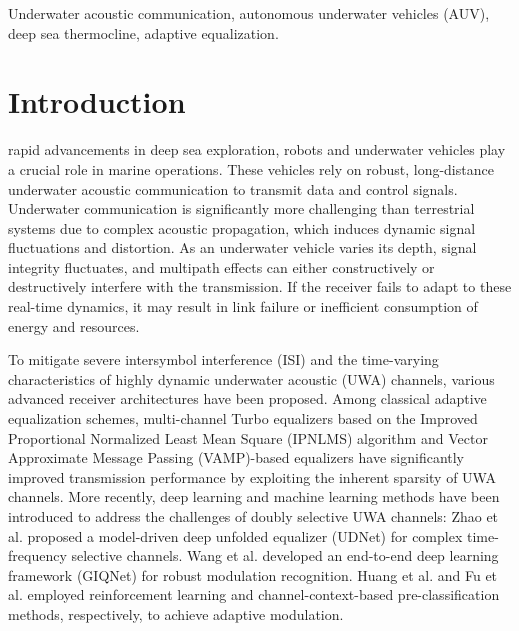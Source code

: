 \documentclass[lettersize,journal]{IEEEtran}
\begin{document}
\begin{IEEEkeywords}
Underwater acoustic communication, autonomous underwater vehicles (AUV), deep sea thermocline, adaptive equalization.
\end{IEEEkeywords}

\section{Introduction}

 rapid advancements in deep sea exploration, robots and underwater vehicles play a crucial role in marine operations. These vehicles rely on robust, long-distance underwater acoustic communication to transmit data and control signals\cite{ref1, ref2}. Underwater communication is significantly more challenging than terrestrial systems due to complex acoustic propagation, which induces dynamic signal fluctuations and distortion. As an underwater vehicle varies its depth, signal integrity fluctuates, and multipath effects can either constructively or destructively interfere with the transmission. If the receiver fails to adapt to these real-time dynamics, it may result in link failure or inefficient consumption of energy and resources.

To mitigate severe intersymbol interference (ISI) and the time-varying characteristics of highly dynamic underwater acoustic (UWA) channels, various advanced receiver architectures have been proposed. Among classical adaptive equalization schemes, multi-channel Turbo equalizers based on the Improved Proportional Normalized Least Mean Square (IPNLMS) algorithm \cite{ref3, ref4} and Vector Approximate Message Passing (VAMP)-based equalizers \cite{ref5} have significantly improved transmission performance by exploiting the inherent sparsity of UWA channels. More recently, deep learning and machine learning methods have been introduced to address the challenges of doubly selective UWA channels: Zhao et al. \cite{ref6} proposed a model-driven deep unfolded equalizer (UDNet) for complex time-frequency selective channels. Wang et al. \cite{ref2} developed an end-to-end deep learning framework (GIQNet) for robust modulation recognition. Huang et al. \cite{ref7} and Fu et al. \cite{ref8} employed reinforcement learning and channel-context-based pre-classification methods, respectively, to achieve adaptive modulation.
\end{document}
